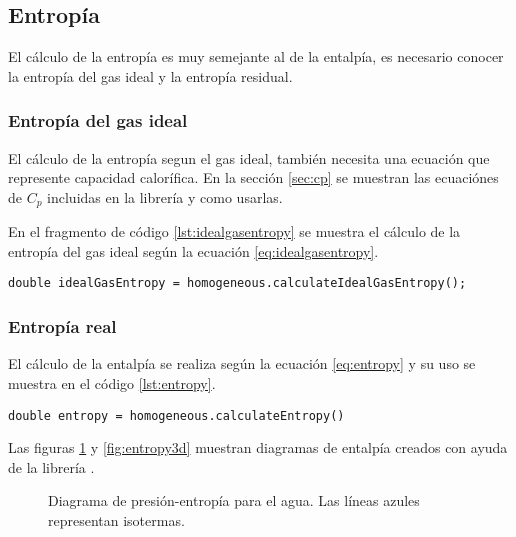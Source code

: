 \subsection{Entropía}

	El cálculo de la entropía es muy semejante al de la entalpía, es necesario conocer la entropía del gas ideal y la entropía residual.

\subsubsection{Entropía del gas ideal}

	El cálculo de la entropía segun el gas ideal, también necesita una ecuación que represente capacidad calorífica. En la sección \ref{sec:cp} se muestran las ecuaciónes de $C_p$ incluidas en la librería y como usarlas.

	En el fragmento de código \ref{lst:idealgasentropy} se muestra el cálculo de la entropía del gas ideal según la ecuación \ref{eq:idealgasentropy}. 

	\begin{lstlisting}[label={lst:idealgasentropy},caption={Cálculo de la entropía absoluta del gas ideal.}]
	double idealGasEntropy = homogeneous.calculateIdealGasEntropy();
	\end{lstlisting}

\subsubsection{Entropía real}

	El cálculo de la entalpía se realiza según la ecuación \ref{eq:entropy} y su uso se muestra en el código \ref{lst:entropy}.

\begin{lstlisting}[label={lst:entropy},caption={Cálculo de la entropía absoluta.}]
	double entropy = homogeneous.calculateEntropy()
\end{lstlisting}

	Las figuras \ref{fig:2dentropy} y \ref{fig:entropy3d} muestran diagramas de entalpía creados con ayuda de la librería \Materia.


\begin{figure}[!h]
	\centering	
	\caption{Diagrama de presión-entropía para el agua. Las líneas azules representan isotermas.}\label{fig:2dentropy}
\end{figure}


